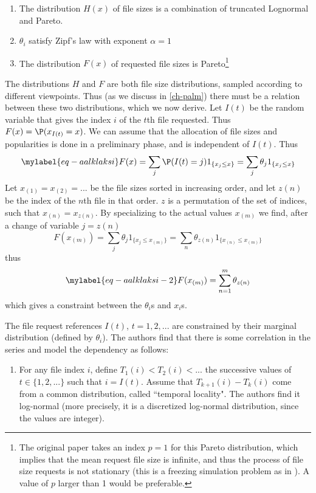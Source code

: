 \begin{enumerate}
\setcounter{enumi}{\value{compt-klsadklsda88}}
  \item \label{enum-klsadklsda88a}The distribution $H(x)$
      of file sizes is a combination of truncated Lognormal and
      Pareto.
  \item $\theta_i$ satisfy Zipf's law with
exponent $\alpha=1$
  \item The distribution $F(x)$ of requested file sizes is
Pareto\footnote{The original paper
\cite{surge-98} takes an index $p=1$ for this
Pareto distribution, which implies that the mean
request file size is infinite, and thus the
process of file size requests is not stationary
(this is a freezing simulation problem as in
). A value of $p$ larger than 1
would be preferable.}\label{page-footnote-surge}
  \setcounter{compt-klsadklsda89}{\value{enumi}}
\end{enumerate}
The distributions $H$ and $F$ are both file size
distributions, sampled according to different
viewpoints. Thus (as we discuss in
\cref{ch-palm}) there must be a relation between
these two distributions, which we now derive. Let
$I(t)$ be the random variable that gives the
index $i$ of the $t$th file requested. Thus
$F(x)= \P(x_{I(t)}=x)$. We can assume that the
allocation of file sizes and popularities is done
in a preliminary phase, and is independent of
$I(t)$. Thus
\begin{equation}\mylabel{eq-aalklaksi}
  F(x)= \sum_j \P(I(t)=j) 1_{\{x_j \leq x\}} = \sum_j \theta_j 1_{\{x_j \leq x\}}
\end{equation}
Let $x_{(1)}=x_{(2)}=...$ be the file sizes
sorted in increasing order, and let $z(n)$ be the
index of the $n$th file in that order. $z$ is a
permutation of the set of indices, such that
$x_{(n)}=x_{z(n)}$. By specializing
 to the actual values
$x_{(m)}$ we find, after a change of variable
$j=z(n)$
$$
 F(x_{(m)})=\sum_j \theta_j 1_{\{x_j \leq x_{(m)}\}} = \sum_n \theta_{z(n)} 1_{\{x_{(n)} \leq x_{(m)}\}}
$$
thus
\begin{equation}\mylabel{eq-aalklaksi-2}
 F(x_{(m)})=\sum_{n=1}^m \theta_{z(n)}
\end{equation}
which gives a constraint between the $\theta_i$s
and $x_i$s.

The file request references $I(t)$, $t=1, 2,...$
are constrained by their marginal distribution
(defined by $\theta_i$). The authors find that
there is some correlation in the series and model
the dependency as follows:
\begin{enumerate}
\setcounter{enumi}{\value{compt-klsadklsda89}}
  \item \label{enum-klsadklsda90} For any file index $i$,
      define $T_1(i) < T_2(i) <...$ the successive values
      of $t \in \{1,2, ...\}$
such that $i=I(t)$. Assume that
$T_{k+1}(i)-T_k(i)$ come from a common
distribution, called ``temporal locality". The
authors find it log-normal (more precisely, it is
a discretized log-normal distribution, since the
values are integer).
\end{enumerate}


